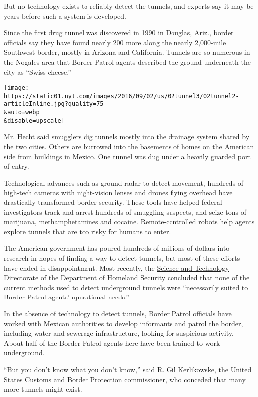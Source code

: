 But no technology exists to reliably detect the tunnels, and experts say
it may be years before such a system is developed.

Since the
\href{http://www.nytimes.com/1990/05/19/us/agents-find-drug-tunnel-to-us.html}{first
drug tunnel was discovered in 1990} in Douglas, Ariz., border officials
say they have found nearly 200 more along the nearly 2,000-mile
Southwest border, mostly in Arizona and California. Tunnels are so
numerous in the Nogales area that Border Patrol agents described the
ground underneath the city as ``Swiss cheese.''

\texttt{[image: https://static01.nyt.com/images/2016/09/02/us/02tunnel3/02tunnel2-articleInline.jpg?quality=75\\\&auto=webp\\\&disable=upscale]}

Mr. Hecht said smugglers dig tunnels mostly into the drainage system
shared by the two cities. Others are burrowed into the basements of
homes on the American side from buildings in Mexico. One tunnel was dug
under a heavily guarded port of entry.

Technological advances such as ground radar to detect movement, hundreds
of high-tech cameras with night-vision lenses and drones flying overhead
have drastically transformed border security. These tools have helped
federal investigators track and arrest hundreds of smuggling suspects,
and seize tons of marijuana, methamphetamines and cocaine.
Remote-controlled robots help agents explore tunnels that are too risky
for humans to enter.

The American government has poured hundreds of millions of dollars into
research in hopes of finding a way to detect tunnels, but most of these
efforts have ended in disappointment. Most recently, the
\href{https://www.dhs.gov/science-and-technology}{Science and Technology
Directorate} of the Department of Homeland Security concluded that none
of the current methods used to detect underground tunnels were
``necessarily suited to Border Patrol agents' operational needs.''

In the absence of technology to detect tunnels, Border Patrol officials
have worked with Mexican authorities to develop informants and patrol
the border, including water and sewerage infrastructure, looking for
suspicious activity. About half of the Border Patrol agents here have
been trained to work underground.

``But you don't know what you don't know,'' said R. Gil Kerlikowske, the
United States Customs and Border Protection commissioner, who conceded
that many more tunnels might exist.


